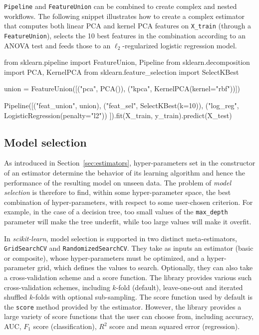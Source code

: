 \documentclass{llncs}
\newcommand{\sklearn}{\textit{scikit-learn}\xspace}
\begin{document}
\texttt{Pipeline} and \texttt{FeatureUnion} can be
combined to create complex and nested workflows.
The following snippet illustrates how to create a complex estimator
that computes both linear PCA and kernel PCA features on \texttt{X\_train}
(through a \texttt{FeatureUnion}),
selects the 10 best features in the combination according to an ANOVA test
and feeds those to an $\ell_2$-regularized logistic regression model.
\begin{pythoncode}
from sklearn.pipeline import FeatureUnion, Pipeline
from sklearn.decomposition import PCA, KernelPCA
from sklearn.feature_selection import SelectKBest

union = FeatureUnion([("pca", PCA()),
                      ("kpca", KernelPCA(kernel="rbf"))])

Pipeline([("feat_union", union),
          ("feat_sel", SelectKBest(k=10)),
          ("log_reg", LogisticRegression(penalty="l2"))
]).fit(X_train, y_train).predict(X_test)
\end{pythoncode}

\subsection{Model selection}

As introduced in Section~\ref{sec:estimators}, hyper-parameters set in the
constructor of an estimator
determine the behavior of its learning algorithm
and hence the performance of the resulting model on unseen data.
The problem of \textit{model selection} is therefore to find, within
some hyper-parameter space, the best combination of hyper-parameters, with
respect to some user-chosen criterion. For example, in the case of a decision
tree, too small values of the \texttt{max\_depth} parameter will make the tree
underfit, while too large values will make it overfit.

In \sklearn, model selection is supported in two distinct meta-estimators,
\texttt{GridSearchCV} and \texttt{RandomizedSearchCV}.  They take as inputs an
estimator (basic or composite), whose hyper-parameters must be optimized, and a
hyper-parameter grid, which defines the values to search. Optionally, they can
also take a cross-validation scheme and a score function.  The library provides
various such cross-validation schemes, including $k$-fold (default),
leave-one-out and iterated shuffled $k$-folds with optional sub-sampling.
The score function used by default is the \texttt{score} method
provided by the estimator. However, the library provides a large variety of
score functions that the user can choose from,
including accuracy, AUC, $F_1$ score (classification),
$R^2$ score and mean squared error (regression).
\end{document}
